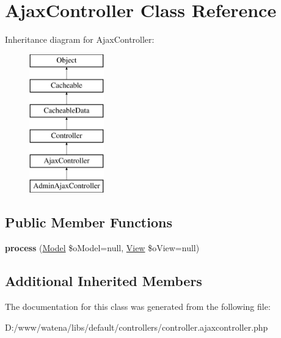 \hypertarget{class_ajax_controller}{\section{Ajax\-Controller Class Reference}
\label{class_ajax_controller}
}
Inheritance diagram for Ajax\-Controller\-:\begin{figure}[H]
\begin{center}
\leavevmode
\includegraphics[height=6.000000cm]{class_ajax_controller}
\end{center}
\end{figure}
\subsection*{Public Member Functions}
\begin{DoxyCompactItemize}
\item 
\hypertarget{class_ajax_controller_ae7a8bf09a7680bbbd1dee67f64389f67}{{\bfseries process} (\hyperlink{class_model}{Model} \$o\-Model=null, \hyperlink{class_view}{View} \$o\-View=null)}\label{class_ajax_controller_ae7a8bf09a7680bbbd1dee67f64389f67}

\end{DoxyCompactItemize}
\subsection*{Additional Inherited Members}


The documentation for this class was generated from the following file\-:\begin{DoxyCompactItemize}
\item 
D\-:/www/watena/libs/default/controllers/controller.\-ajaxcontroller.\-php\end{DoxyCompactItemize}
